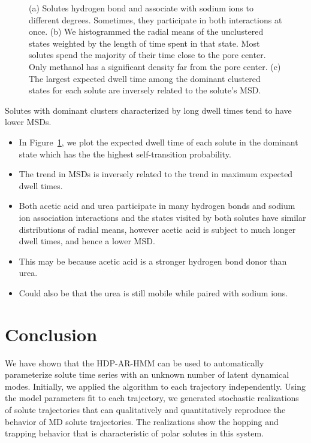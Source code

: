 \documentclass[journal=jpcbfk,manuscript=article]{achemso}
\begin{document}
\begin{figure}
\begin{subfigure}{0.325\textwidth}
  \caption{}\label{fig:dwell_time_summary}
  \end{subfigure}
  \caption{(a) Solutes hydrogen bond and associate with sodium ions
  to different degrees. Sometimes, they participate in both interactions at
  once. (b) We histogrammed the radial means of the unclustered states weighted
  by the length of time spent in that state. Most solutes spend the majority of
  their time close to the pore center. Only methanol has a significant density
  far from the pore center. (c) The largest expected dwell time among the dominant 
  clustered states for each solute are inversely related to the solute's MSD. 
  }\label{fig:summaries}
  \end{figure}
  
  Solutes with dominant clusters characterized by long dwell times tend to 
  have lower MSDs.
  \begin{itemize}
    \item In Figure~\ref{fig:dwell_time_summary}, we plot the expected dwell
    time of each solute in the dominant state which has the the highest
    self-transition probability. 
    \item The trend in MSDs is inversely related to the trend in maximum
    expected dwell times.
    \item Both acetic acid and urea participate in many hydrogen bonds and
    sodium ion association interactions and the states visited by both solutes
    have similar distributions of radial means, however acetic acid is 
    subject to much longer dwell times, and hence a lower MSD.
    \item This may be because acetic acid is a stronger hydrogen bond donor
    than urea. 
    \item Could also be that the urea is still mobile while paired with sodium ions.
  \end{itemize}
  
  \section{Conclusion}
  
  We have shown that the HDP-AR-HMM can be used to automatically parameterize solute 
  time series with an unknown number of latent dynamical modes. Initially, we applied
  the algorithm to each trajectory independently. Using the model parameters fit
  to each trajectory, we generated stochastic realizations of solute trajectories that
  can qualitatively and quantitatively reproduce the behavior of MD solute 
  trajectories. The realizations show the hopping and trapping behavior that is
  characteristic of polar solutes in this system. 
  
\end{document}
